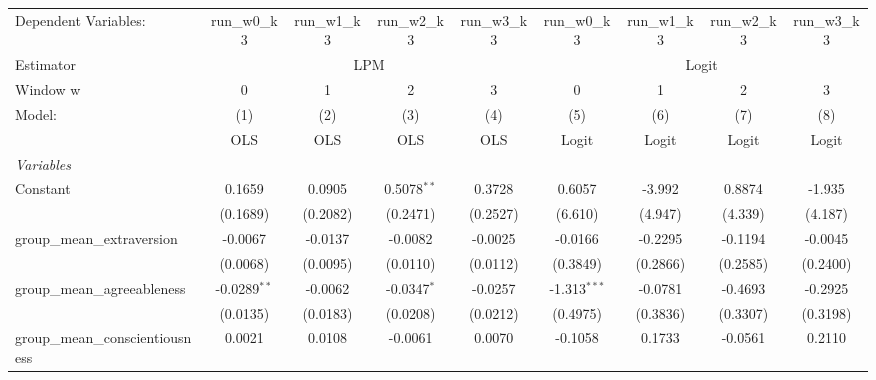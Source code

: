 \begin{tabular}{lcccccccc}
   \tabularnewline \midrule \midrule
   Dependent Variables:             & run\_w0\_k3     & run\_w1\_k3     & run\_w2\_k3     & run\_w3\_k3     & run\_w0\_k3    & run\_w1\_k3    & run\_w2\_k3    & run\_w3\_k3\\    
   Estimator & \multicolumn{4}{c}{LPM} & \multicolumn{4}{c}{Logit} \\ 
   Window w                         & 0               & 1               & 2               & 3               & 0              & 1              & 2              & 3 \\   
   Model:                           & (1)             & (2)             & (3)             & (4)             & (5)            & (6)            & (7)            & (8)\\  
                                    &  OLS            & OLS             & OLS             & OLS             & Logit          & Logit          & Logit          & Logit\\  
   \midrule
   \emph{Variables}\\
   Constant                         & 0.1659          & 0.0905          & 0.5078$^{**}$   & 0.3728          & 0.6057         & -3.992         & 0.8874         & -1.935\\   
                                    & (0.1689)        & (0.2082)        & (0.2471)        & (0.2527)        & (6.610)        & (4.947)        & (4.339)        & (4.187)\\   
   group\_mean\_extraversion        & -0.0067         & -0.0137         & -0.0082         & -0.0025         & -0.0166        & -0.2295        & -0.1194        & -0.0045\\   
                                    & (0.0068)        & (0.0095)        & (0.0110)        & (0.0112)        & (0.3849)       & (0.2866)       & (0.2585)       & (0.2400)\\   
   group\_mean\_agreeableness       & -0.0289$^{**}$  & -0.0062         & -0.0347$^{*}$   & -0.0257         & -1.313$^{***}$ & -0.0781        & -0.4693        & -0.2925\\   
                                    & (0.0135)        & (0.0183)        & (0.0208)        & (0.0212)        & (0.4975)       & (0.3836)       & (0.3307)       & (0.3198)\\   
   group\_mean\_conscientiousness   & 0.0021          & 0.0108          & -0.0061         & 0.0070          & -0.1058        & 0.1733         & -0.0561        & 0.2110\\   

\end{tabular}
